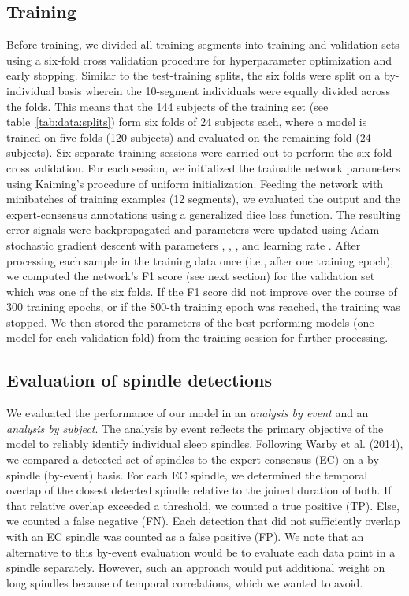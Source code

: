 \documentclass[fleqn,twocolumn,10pt]{wlscirep}
\begin{document}
\subsection{Training}

Before training, we divided all training segments into training and validation
sets using a six-fold cross validation procedure for hyperparameter optimization
and early stopping.
Similar to the test-training splits, the six folds were split on a by-individual
basis wherein the 10-segment individuals were equally divided across the folds.
This means that the 144 subjects of the training set (see table~\ref{tab:data:splits})
form six folds of 24 subjects each, where a model is trained on five folds
(120 subjects) and evaluated on the remaining fold (24 subjects).
Six separate training sessions were carried out to perform the six-fold cross validation.
For each session, we
initialized the trainable network parameters using Kaiming's procedure of
uniform initialization\cite{KaimingHe2015}.
Feeding the network with minibatches of training examples (12 segments), we
evaluated the output and the expert-consensus annotations using a generalized
dice loss function\cite{Sudre2017}.  The resulting error signals were
backpropagated and parameters were updated using Adam stochastic gradient
descent with parameters , , , and
learning rate \cite{Kingma2015}.
After processing each sample in the training data once (i.e., after one training
epoch), we computed the network's F1 score (see next section) for the
validation set which was one of the six folds.  If the F1 score did not improve
over the course of 300 training epochs, or if the 800-th training epoch was reached, the training
was stopped.  We then stored the parameters of the best performing models
(one model for each validation fold)
from the training session for further processing.

\subsection{Evaluation of spindle detections}
\label{sec:detection_evaluation}

We evaluated the performance of our model in an \emph{analysis by event} and an
\emph{analysis by subject}. The analysis by event reflects the primary objective
of the model to reliably identify individual sleep spindles.
Following Warby et al. (2014)\cite{Warby2014}, we compared a detected set of
spindles to the expert consensus (EC) on a by-spindle (by-event) basis.  For each EC
spindle, we determined the temporal overlap of the closest detected spindle
relative to the joined duration of both.  If that relative overlap exceeded a
threshold, we counted a true positive (TP).  Else, we counted a false negative (FN).
Each detection that did not sufficiently overlap with an EC spindle was counted
as a false positive (FP).
We note that an alternative to this by-event evaluation would be to evaluate
each data point in a spindle separately. However, such an approach
would put additional weight on long spindles because of temporal
correlations, which we wanted to avoid.
\end{document}
